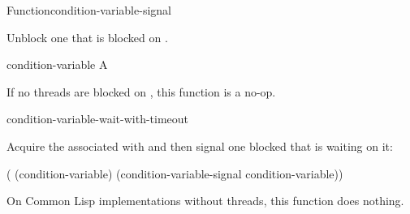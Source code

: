 \documentclass[10pt,twoside,english,pdftex]{article}
\begin{document}

\begin{functiondoc}{Function}{condition-variable-signal}%
  {}
%

\fnsyntax

\fnpurpose Unblock one  that is blocked on .

\fnpackage {}

\fnmodule {}

\fnargs
\begin{args}{condition-variable}
 A 
\end{args}

\fnerrors
\nocvlock{}

\fndescription If no threads are blocked on , this
function is a no-op.

\begin{alsos}{condition-variable-wait-with-timeout}
\end{alsos}

%
\fnexample Acquire the  associated with 
and then signal one blocked  that is waiting on it:
\begin{example}
  ( (condition-variable)
    (condition-variable-signal condition-variable))
\end{example}

\fnnotes On Common Lisp implementations without threads, this function does
nothing.

\end{functiondoc}

\end{document}
